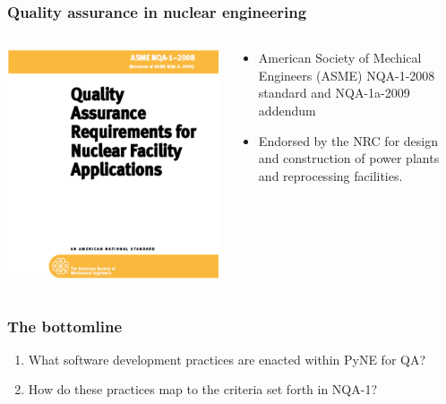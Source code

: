 \documentclass[12pt]{beamer}
\begin{document}
\begin{frame}[fragile]
\frametitle{Quality assurance in nuclear engineering}

\begin{columns}[T]
\begin{column}{0.5\textwidth}
\includegraphics[width=\textwidth]{figures/nqa-1-2008.png}
\end{column}
\begin{column}{0.5\textwidth}
\begin{itemize}
\item{American Society of Mechical Engineers (ASME)
NQA-1-2008 \cite{nqa} standard and NQA-1a-2009 \cite{add} addendum}
\item{Endorsed by the NRC for design and construction of power plants and reprocessing facilities.}
\end{itemize}
\end{column}
\end{columns}


\end{frame}
\begin{frame}[fragile]
\frametitle{The bottomline}

\begin{enumerate}
\item{What software development practices are enacted within PyNE for QA?}
\item{How do these practices map to the criteria set forth in NQA-1?}
\end{enumerate}


\end{frame}
\end{document}
